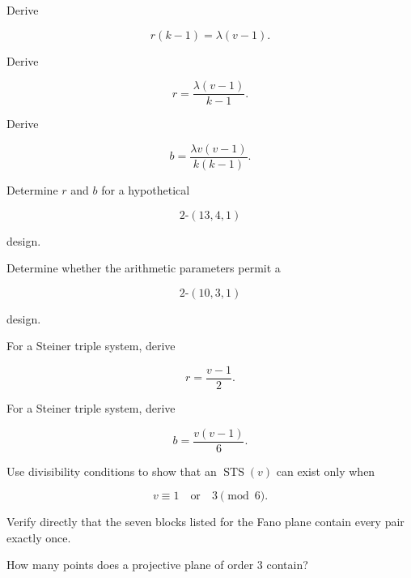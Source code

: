 \begin{exercise}[2]
Derive

\[
r(k-1)
=
\lambda(v-1).
\]
\end{exercise}

\begin{exercise}[2]
Derive

\[
r
=
\frac{\lambda(v-1)}{k-1}.
\]
\end{exercise}

\begin{exercise}[2]
Derive

\[
b
=
\frac{\lambda v(v-1)}
{k(k-1)}.
\]
\end{exercise}

\begin{exercise}[2]
Determine \(r\) and \(b\) for a hypothetical

\[
2\text{-}(13,4,1)
\]

design.
\end{exercise}

\begin{exercise}[2]
Determine whether the arithmetic parameters permit a

\[
2\text{-}(10,3,1)
\]

design.
\end{exercise}

\begin{exercise}[2]
For a Steiner triple system, derive

\[
r=\frac{v-1}{2}.
\]
\end{exercise}

\begin{exercise}[2]
For a Steiner triple system, derive

\[
b=\frac{v(v-1)}6.
\]
\end{exercise}

\begin{exercise}[2]
Use divisibility conditions to show that an \(\operatorname{STS}(v)\)
can exist only when

\[
v\equiv1
\quad\text{or}\quad
3
\pmod6.
\]
\end{exercise}

\begin{exercise}[2]
Verify directly that the seven blocks listed for the Fano plane contain
every pair exactly once.
\end{exercise}

\begin{exercise}[2]
How many points does a projective plane of order \(3\) contain?
\end{exercise}


